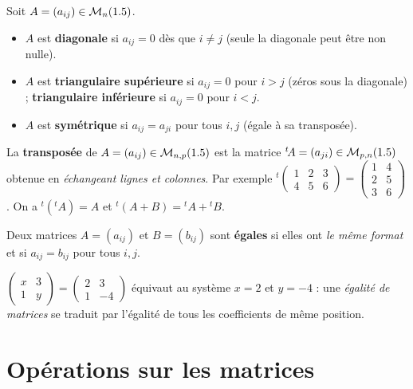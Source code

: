 \begin{definition}
Soit $A=(a_{ij})\in\mathcal M_n(1.5)$.
\begin{itemize}
\item $A$ est \textbf{diagonale} si $a_{ij}=0$ dès que $i\neq j$ (seule la diagonale peut être non nulle).
\item $A$ est \textbf{triangulaire supérieure} si $a_{ij}=0$ pour $i>j$ (zéros sous la diagonale) ;
\textbf{triangulaire inférieure} si $a_{ij}=0$ pour $i<j$.
\item $A$ est \textbf{symétrique} si $a_{ij}=a_{ji}$ pour tous $i,j$ (égale à sa transposée).
\end{itemize}
\end{definition}

\begin{definition}[Transposée]
La \textbf{transposée} de $A=(a_{ij})\in\mathcal M_{n,p}(1.5)$ est la matrice
${}^{t}\!A=(a_{ji})\in\mathcal M_{p,n}(1.5)$ obtenue en \emph{échangeant lignes et colonnes}.
Par exemple ${}^{t}\!\begin{pmatrix}1&2&3\\4&5&6\end{pmatrix}=\begin{pmatrix}1&4\\2&5\\3&6\end{pmatrix}$.
On a ${}^{t}({}^{t}\!A)=A$ et ${}^{t}(A+B)={}^{t}\!A+{}^{t}\!B$.
\end{definition}

\begin{definition}[Égalité]
Deux matrices $A=(a_{ij})$ et $B=(b_{ij})$ sont \textbf{égales} si elles ont \emph{le même
format} et si $a_{ij}=b_{ij}$ pour tous $i,j$.
\end{definition}

\begin{exemple}
$\begin{pmatrix}x&3\\1&y\end{pmatrix}=\begin{pmatrix}2&3\\1&-4\end{pmatrix}$ équivaut au système
$x=2$ et $y=-4$ : une \emph{égalité de matrices} se traduit par l'égalité de tous les coefficients
de même position.
\end{exemple}

\section{Opérations sur les matrices}

